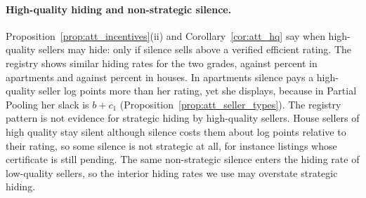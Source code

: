 \paragraph{High-quality hiding and non-strategic silence.}
Proposition~\ref{prop:att_incentives}(ii) and Corollary~\ref{cor:att_hq} say when high-quality sellers may hide: only if silence sells above a verified efficient rating. The registry shows similar hiding rates for the two grades, \attSigmaOneApt{} against \attSigmaZeroApt{} percent in apartments and \attSigmaOneHouse{} against \attSigmaZeroHouse{} percent in houses. In apartments silence pays a high-quality seller \attExcessApt{} log points more than her rating, yet she displays, because in Partial Pooling her slack is $b+c_1$ (Proposition~\ref{prop:att_seller_types}). The registry pattern is not evidence for strategic hiding by high-quality sellers. House sellers of high quality stay silent although silence costs them about \attHighLossHouse{} log points relative to their rating, so some silence is not strategic at all, for instance listings whose certificate is still pending. The same non-strategic silence enters the hiding rate of low-quality sellers, so the interior hiding rates we use may overstate strategic hiding.
